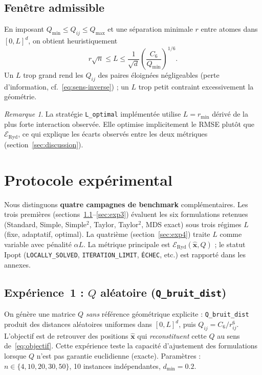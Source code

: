 \documentclass[11pt,a4paper]{article}
\theoremstyle{definition}
\theoremstyle{remark}
\newtheorem{remark}[theorem]{Remarque}
\newcommand{\Eryd}{\mathcal{E}_{\mathrm{Ryd}}}
\newcommand{\cSix}{C_6}
\begin{document}
\subsection{Fenêtre admissible}
En imposant $Q_{\min} \leq Q_{ij} \leq Q_{\max}$ et une séparation minimale
$r$ entre atomes dans $[0,L]^d$, on obtient heuristiquement
\begin{equation}
  r\sqrt{n} \leq L \leq \frac{1}{\sqrt{d}}\left(\frac{\cSix}{Q_{\min}}\right)^{1/6}.
\end{equation}
Un $L$ trop grand rend les $Q_{ij}$ des paires éloignées négligeables
(perte d'information, cf.~\eqref{eq:sens-inverse}) ; un $L$ trop petit
contraint excessivement la géométrie.

\begin{remark}
La stratégie \texttt{L\_optimal} implémentée utilise $L = r_{\min}$ dérivé
de la plus forte interaction observée. Elle optimise implicitement le RMSE
plutôt que $\Eryd$, ce qui explique les écarts observés entre les deux
métriques (section~\ref{sec:discussion}).
\end{remark}

\section{Protocole expérimental}
\label{sec:protocole}

Nous distinguons \textbf{quatre campagnes de benchmark} complémentaires.
Les trois premières (sections~\ref{sec:exp1}--\ref{sec:exp3}) évaluent les
six formulations retenues (Standard, Simple, Simple$^2$, Taylor,
Taylor$^2$, MDS exact) sous trois régimes $L$ (fixe, adaptatif, optimal).
La quatrième (section~\ref{sec:exp4}) traite $L$ comme variable avec
pénalité $\alpha L$. La métrique principale est
$\mathcal{E}_{\mathrm{Ryd}}(\hat{\mathbf{x}}, Q)$ ; le statut Ipopt
(\texttt{LOCALLY\_SOLVED}, \texttt{ITERATION\_LIMIT}, \texttt{ÉCHEC}, etc.)
est rapporté dans les annexes.

\subsection{Expérience~1 : $Q$ aléatoire (\texttt{Q\_bruit\_dist})}
\label{sec:exp1}
On génère une matrice $Q$ \emph{sans} référence géométrique explicite :
\texttt{Q\_bruit\_dist} produit des distances aléatoires uniformes dans
$[0,L]^d$, puis $Q_{ij} = \cSix/r_{ij}^6$. L'objectif est de retrouver
des positions $\hat{\mathbf{x}}$ qui \emph{reconstituent} cette $Q$
au sens de~\eqref{eq:objectif}. Cette expérience teste la capacité
d'ajustement des formulations lorsque $Q$ n'est pas garantie euclidienne
(exacte). Paramètres : $n \in \{4,10,20,30,50\}$, 10 instances
indépendantes, $d_{\min} = 0.2$.
\end{document}
